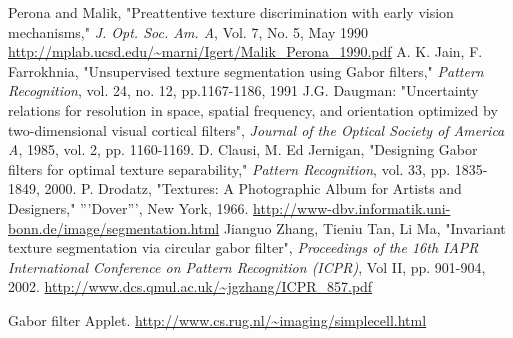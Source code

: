 \documentclass[article,oneside]{memoir}
\begin{document}
 \begin{thebibliography}{99}
 
 Perona and Malik, "Preattentive texture discrimination with early vision mechanisms," \textit{J. Opt. Soc. Am. A}, Vol. 7, No. 5, May 1990 \url{http://mplab.ucsd.edu/~marni/Igert/Malik_Perona_1990.pdf}
  A. K. Jain, F. Farrokhnia, "Unsupervised texture segmentation using Gabor filters,"  \textit{Pattern Recognition}, vol. 24, no. 12, pp.1167-1186, 1991
 J.G. Daugman: "Uncertainty relations for resolution in space, spatial frequency, and orientation optimized by two-dimensional visual cortical filters", \textit{Journal of the Optical Society of America A}, 1985, vol. 2, pp. 1160-1169.
  D. Clausi, M. Ed Jernigan, "Designing Gabor filters for optimal texture separability," \textit{Pattern Recognition}, vol. 33, pp. 1835-1849, 2000. 
 P. Drodatz, "Textures: A Photographic Album for Artists and Designers," '''Dover''', New York, 1966. \url{http://www-dbv.informatik.uni-bonn.de/image/segmentation.html}
 Jianguo Zhang, Tieniu Tan, Li Ma, "Invariant texture segmentation via circular gabor filter",  \textit{Proceedings of the 16th IAPR International Conference on Pattern Recognition (ICPR)}, Vol II, pp. 901-904, 2002. \url{http://www.dcs.qmul.ac.uk/~jgzhang/ICPR_857.pdf}

 Gabor filter Applet. \url{http://www.cs.rug.nl/~imaging/simplecell.html}
\end{thebibliography}
\end{document}
